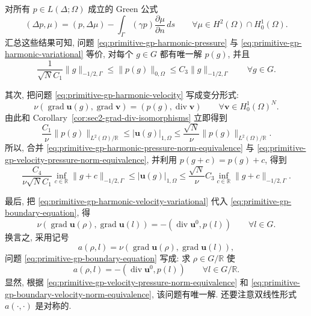 对所有 $p\in L(\Delta;\Omega)$ 成立的 Green 公式
\[
(\Delta p,\mu)=(p,\Delta\mu)
-\int_\Gamma(\gamma p)\frac{\partial\mu}{\partial n}\,ds
\qquad\forall\mu\in H^2(\Omega)\cap H_0^1(\Omega).
\]
汇总这些结果可知, 问题 \eqref{eq:primitive-gp-harmonic-pressure} 与
\eqref{eq:primitive-gp-harmonic-variational} 等价, 对每个 $g\in G$ 都有唯一解
$p(g)$, 并且
\begin{equation}\label{eq:primitive-gp-harmonic-pressure-norm-equivalence}
\frac1{\sqrt N C_1}\|g\|_{-1/2,\Gamma}
\leq\|p(g)\|_{0,\Omega}
\leq C_3\|g\|_{-1/2,\Gamma}
\qquad\forall g\in G.
\end{equation}

其次, 把问题 \eqref{eq:primitive-gp-harmonic-velocity} 写成变分形式:
\begin{equation}\label{eq:primitive-gp-harmonic-velocity-variational}
\nu(\operatorname{grad}\mathbf u(g),\operatorname{grad}\mathbf v)
=(p(g),\operatorname{div}\mathbf v)
\qquad\forall\mathbf v\in H_0^1(\Omega)^N.
\end{equation}
由此和 Corollary~\ref{cor:sec2-grad-div-isomorphisms} 立即得到
\begin{equation}\label{eq:primitive-gp-velocity-pressure-norm-equivalence}
\frac{C_1}{\nu}\|p(g)\|_{L^2(\Omega)/\mathbb R}
\leq|\mathbf u(g)|_{1,\Omega}
\leq\frac{\sqrt N}{\nu}\|p(g)\|_{L^2(\Omega)/\mathbb R}.
\end{equation}
所以, 合并 \eqref{eq:primitive-gp-harmonic-pressure-norm-equivalence} 与
\eqref{eq:primitive-gp-velocity-pressure-norm-equivalence}, 并利用
$p(g+c)=p(g)+c$, 得到
\begin{equation}\label{eq:primitive-gp-boundary-velocity-norm-equivalence}
\frac{C_4}{\nu\sqrt N C_1}
\inf_{c\in\mathbb R}\|g+c\|_{-1/2,\Gamma}
\leq|\mathbf u(g)|_{1,\Omega}
\leq\frac{\sqrt N}{\nu}C_3
\inf_{c\in\mathbb R}\|g+c\|_{-1/2,\Gamma}.
\end{equation}

最后, 把 \eqref{eq:primitive-gp-harmonic-velocity-variational} 代入
\eqref{eq:primitive-gp-boundary-equation}, 得
\[
\nu(\operatorname{grad}\mathbf u(\rho),
\operatorname{grad}\mathbf u(l))
=-(\operatorname{div}\mathbf u^0,p(l))
\qquad\forall l\in G.
\]
换言之, 采用记号
\begin{equation}\label{eq:primitive-gp-continuous-bilinear-form}
a(\rho,l)=\nu(\operatorname{grad}\mathbf u(\rho),
\operatorname{grad}\mathbf u(l)),
\end{equation}
问题 \eqref{eq:primitive-gp-boundary-equation} 写成: 求 $\rho\in G/\mathbb R$ 使
\begin{equation}\label{eq:primitive-gp-continuous-boundary-problem}
a(\rho,l)=-(\operatorname{div}\mathbf u^0,p(l))
\qquad\forall l\in G/\mathbb R.
\end{equation}
显然, 根据 \eqref{eq:primitive-gp-velocity-pressure-norm-equivalence} 和
\eqref{eq:primitive-gp-boundary-velocity-norm-equivalence}, 该问题有唯一解.
还要注意双线性形式 $a(\cdot,\cdot)$ 是对称的.

